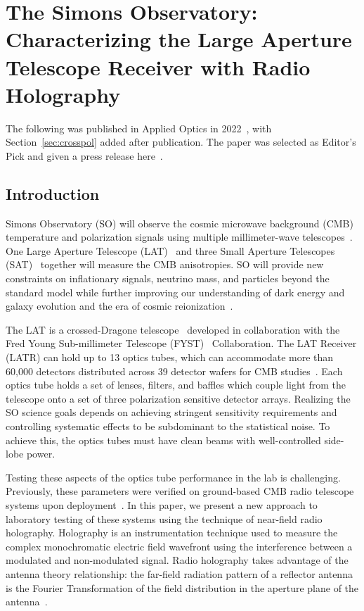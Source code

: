 \chapter{The Simons Observatory: Characterizing the Large Aperture Telescope Receiver with Radio Holography}
\label{ch:ot_holo}
The following was published in Applied Optics in 2022~\cite{chesmore2022}, with Section~\ref{sec:crosspol} added after publication.  The paper was selected as Editor's Pick and given a press release here~\cite{SOLATpress}.
\section{Introduction}

Simons Observatory (SO) will observe the cosmic microwave background (CMB) temperature and polarization signals using multiple millimeter-wave telescopes~\cite{gali18, so19}.  One Large Aperture Telescope (LAT)~\cite{Niemack:16, Gudmundsson:21,Parshley_2018} and three Small Aperture Telescopes (SAT)~\cite{ali20} together will measure the CMB anisotropies.  SO will provide new constraints on inflationary signals, neutrino mass, and particles beyond the standard model while further improving our understanding of dark energy and galaxy evolution and the era of cosmic reionization~\citep{so19}. 

The LAT is a crossed-Dragone telescope~\cite{6773968,Niemack:16,2021RNAAS...5..100X} developed in collaboration with the Fred Young Sub-millimeter Telescope (FYST)~\cite{ccat,aravena2019ccatprime} Collaboration.  The LAT Receiver (LATR) can hold up to 13 optics tubes, which can accommodate more than 60,000 detectors distributed across 39 detector wafers for CMB studies~\cite{Parshley_2018,2021ApJS25623Z,mccarrick2021simons}.  Each optics tube holds a set of lenses, filters, and baffles which couple light from the telescope onto a set of three polarization sensitive detector arrays.   Realizing the SO science goals depends on achieving stringent sensitivity requirements and controlling systematic effects to be subdominant to the statistical noise.   To achieve this, the optics tubes must have clean beams with well-controlled side-lobe power.  

Testing these aspects of the optics tube performance in the lab is challenging.  Previously, these parameters were verified on ground-based CMB radio telescope systems upon deployment~\cite{alma_holog,2007A&A...465..679N}.  In this paper, we present a new approach to laboratory testing of these systems using the technique of near-field radio holography.  Holography is an instrumentation technique used to measure the complex monochromatic electric field wavefront using the interference between a modulated and non-modulated signal.  Radio holography takes advantage of the antenna theory relationship: the far-field radiation pattern of a reflector antenna is the Fourier Transformation of the field distribution in the aperture plane of the antenna~\cite{alma_holog}.

